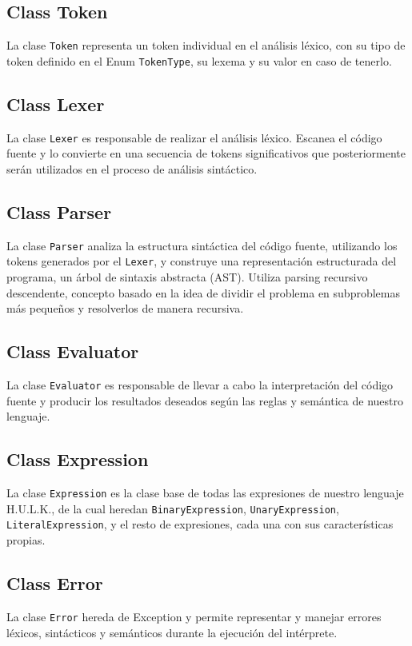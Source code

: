 \documentclass[12pt,a4paper]{article}
\begin{document}
\subsection{Class Token}
La clase \texttt{Token} representa un token individual en el análisis léxico, con su tipo de token definido en el Enum \texttt{TokenType}, su lexema y su valor en caso de tenerlo.
\subsection{Class Lexer}
La clase \texttt{Lexer} es responsable de realizar el análisis léxico. Escanea el código fuente y lo convierte en una secuencia de tokens significativos que posteriormente serán utilizados en el proceso de análisis sintáctico.
\subsection{Class Parser}
La clase \texttt{Parser} analiza la estructura sintáctica del código fuente, utilizando los tokens generados por el \texttt{Lexer}, y construye una representación estructurada del programa, un árbol de sintaxis abstracta (AST). Utiliza parsing recursivo descendente, concepto basado en la idea de dividir el problema en subproblemas más pequeños y resolverlos de manera recursiva.
\subsection{Class Evaluator}
La clase \texttt{Evaluator} es responsable de llevar a cabo la interpretación del código fuente y producir los resultados deseados según las reglas y semántica de nuestro lenguaje.
\subsection{Class Expression}
La clase \texttt{Expression} es la clase base de todas las expresiones de nuestro lenguaje H.U.L.K., de la cual heredan \texttt{BinaryExpression}, \texttt{UnaryExpression}, \texttt{LiteralExpression}, y el resto de expresiones, cada una con sus características propias.
\subsection{Class Error}
La clase \texttt{Error} hereda de Exception y permite representar y manejar errores léxicos, sintácticos y semánticos durante la ejecución del intérprete.
\end{document}
